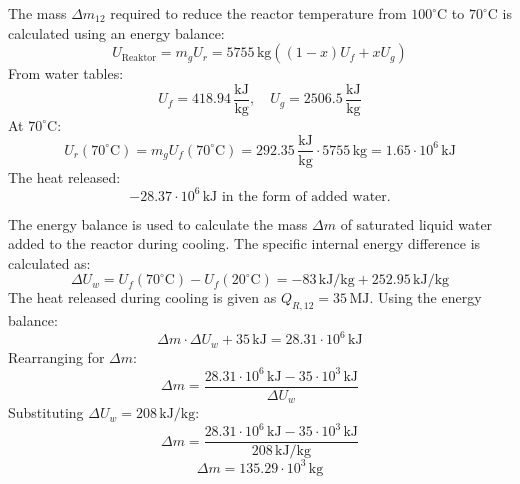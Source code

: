 The mass \( \Delta m_{12} \) required to reduce the reactor temperature from \( 100^\circ\text{C} \) to \( 70^\circ\text{C} \) is calculated using an energy balance:  
\[
U_{\text{Reaktor}} = m_g U_r = 5755 \, \text{kg} \left( (1-x) U_f + x U_g \right)
\]  
From water tables:  
\[
U_f = 418.94 \, \frac{\text{kJ}}{\text{kg}}, \quad U_g = 2506.5 \, \frac{\text{kJ}}{\text{kg}}
\]  
At \( 70^\circ\text{C} \):  
\[
U_r(70^\circ\text{C}) = m_g U_f(70^\circ\text{C}) = 292.35 \, \frac{\text{kJ}}{\text{kg}} \cdot 5755 \, \text{kg} = 1.65 \cdot 10^6 \, \text{kJ}
\]  
The heat released:  
\[
-28.37 \cdot 10^6 \, \text{kJ} \text{ in the form of added water.}
\]

The energy balance is used to calculate the mass \( \Delta m \) of saturated liquid water added to the reactor during cooling. The specific internal energy difference is calculated as:  
\[
\Delta U_w = U_f(70^\circ\text{C}) - U_f(20^\circ\text{C}) = -83 \, \text{kJ/kg} + 252.95 \, \text{kJ/kg}
\]  
The heat released during cooling is given as \( Q_{R,12} = 35 \, \text{MJ} \). Using the energy balance:  
\[
\Delta m \cdot \Delta U_w + 35 \, \text{kJ} = 28.31 \cdot 10^6 \, \text{kJ}
\]  
Rearranging for \( \Delta m \):  
\[
\Delta m = \frac{28.31 \cdot 10^6 \, \text{kJ} - 35 \cdot 10^3 \, \text{kJ}}{\Delta U_w}
\]  
Substituting \( \Delta U_w = 208 \, \text{kJ/kg} \):  
\[
\Delta m = \frac{28.31 \cdot 10^6 \, \text{kJ} - 35 \cdot 10^3 \, \text{kJ}}{208 \, \text{kJ/kg}}
\]  
\[
\Delta m = 135.29 \cdot 10^3 \, \text{kg}
\]
